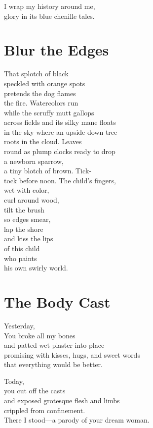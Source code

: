 \documentclass[twoside,10pt]{book}
\begin{document}
I wrap my history around me,\\
glory in its blue chenille tales.


\clearpage
\section{Blur the Edges}

That splotch of black\\
speckled with orange spots\\
pretends the dog flames\\
the fire. Watercolors run\\
while the scruffy mutt gallops\\
across fields and its silky mane floats\\
in the sky where an upside-down tree\\
roots in the cloud. Leaves\\
round as plump clocks ready to drop\\
a newborn sparrow,\\
a tiny blotch of brown. Tick-\\
tock before noon. The child's fingers,\\
wet with color,\\
curl around wood,\\
tilt the brush\\
so edges smear,\\
lap the shore\\
and kiss the lips\\
of this child\\
who paints\\
his own swirly world.


\clearpage
\section{The Body Cast}

Yesterday,\\
You broke all my bones\\
and patted wet plaster into place\\
promising with kisses, hugs, and sweet words\\
that everything would be better.

Today,\\
you cut off the casts\\
and exposed grotesque flesh and limbs\\
crippled from confinement.\\
There I stood---a parody of your dream woman.
\end{document}
